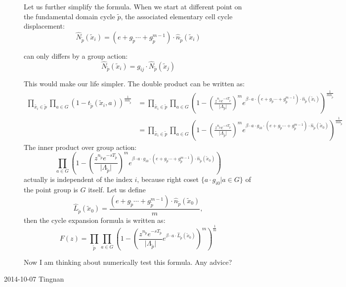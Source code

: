 \begin{description}
Let us further simplify the formula. When we start at different point
on the fundamental domain cycle $\tilde{p}$, the associated elementary
cell cycle displacement:
\[
\hat{N}_{\tilde{p}}(\tilde{x}_{i})=(e+g_{\tilde{p}}\cdots+g_{\tilde{p}}^{m-1})\cdot\hat{n}_{\tilde{p}}(\tilde{x}_{i})
\]


can only differs by a group action:
\[
\hat{N}_{\tilde{p}}(\tilde{x}_{i})=g_{ij}\cdot\hat{N}_{\tilde{p}}(\tilde{x}_{j})
\]


This would make our life simpler. The double product can be written
as:
\begin{align*}
\prod_{\tilde{x_{i}}\in\tilde{p}}\prod_{a\in G}\left(1-t_{\tilde{p}}(\tilde{x}_{i},a)\right)^{\frac{1}{mn_{\tilde{p}}}} & =\prod_{\tilde{x_{i}}\in\tilde{p}}\prod_{a\in G}\left(1-\left(\frac{z^{n_{\tilde{p}}}e^{-sT_{\tilde{p}}}}{\vert\Lambda_{\tilde{p}}\vert}\right)^{m}e^{\beta\cdot a\cdot(e+g_{\tilde{p}}\cdots+g_{\tilde{p}}^{m-1})\cdot\hat{n}_{\tilde{p}}(\tilde{x}_{i})}\right)^{\frac{1}{mn_{\tilde{p}}}}\\
 & =\prod_{\tilde{x_{i}}\in\tilde{p}}\prod_{a\in G}\left(1-\left(\frac{z^{n_{\tilde{p}}}e^{-sT_{\tilde{p}}}}{\vert\Lambda_{\tilde{p}}\vert}\right)^{m}e^{\beta\cdot a\cdot g_{i0}\cdot(e+g_{\tilde{p}}\cdots+g_{\tilde{p}}^{m-1})\cdot\hat{n}_{\tilde{p}}(\tilde{x}_{0})}\right)^{\frac{1}{mn_{\tilde{p}}}}
\end{align*}
The inner product over group action:
\[
\prod_{a\in G}\left(1-\left(\frac{z^{n_{\tilde{p}}}e^{-sT_{\tilde{p}}}}{\vert\Lambda_{\tilde{p}}\vert}\right)^{m}e^{\beta\cdot a\cdot g_{i0}\cdot(e+g_{\tilde{p}}\cdots+g_{\tilde{p}}^{m-1})\cdot\hat{n}_{\tilde{p}}(\tilde{x}_{0})}\right)
\]
actually is independent of the index $i$, because right coset $\{a\cdot g_{i0}\vert a\in G\}$
of the point group is $G$ itself. Let us define
\[
\hat{L}_{\tilde{p}}(\tilde{x}_{0})=\frac{(e+g_{\tilde{p}}\cdots+g_{\tilde{p}}^{m-1})\cdot\hat{n}_{\tilde{p}}(\tilde{x}_{0})}{m},
\]
then the cycle expansion formula is written as:
\[
F(z)=\prod_{\tilde{p}}\prod_{a\in G}\left(1-\left(\frac{z^{n_{\tilde{p}}}e^{-sT_{\tilde{p}}}}{\vert\Lambda_{\tilde{p}}\vert}e^{\beta\cdot a\cdot\hat{L}_{\tilde{p}}(\tilde{x}_{0})}\right)^{m}\right)^{\frac{1}{m}}
\]

Now I am thinking about numerically test this formula. Any advice?


\item[2014-10-07 Tingnan]



\end{description}
